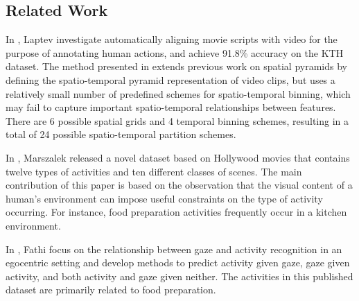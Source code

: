 \documentclass[10pt,twocolumn,letterpaper]{article}
\begin{document}
\subsection{Related Work}


	In \cite{Laptev08}, Laptev \etal investigate automatically aligning movie scripts with
	video for the purpose of annotating human actions, and achieve 91.8\%
  accuracy on the KTH dataset. The method presented in \cite{Laptev08} 
  extends previous work on spatial pyramids \cite{Bosch07, Lazebnik06}
  by defining the spatio-temporal pyramid representation of video clips, but uses a
  relatively small number of predefined schemes for spatio-temporal binning,
  which may fail to capture important spatio-temporal relationships between
  features. There are 6 possible spatial grids and 4 temporal binning
  schemes, resulting in a total of 24 possible spatio-temporal partition
  schemes. 
	
	In \cite{Marszalek09}, Marszalek \etal released a novel dataset based on
	Hollywood movies that contains twelve types of activities and ten
	different classes of scenes. The main contribution of this paper is based
	on the observation that the visual content of a human's environment can
	impose useful constraints on the type of activity occurring. For instance,
	food preparation activities frequently occur in a kitchen environment. 
	
	In \cite{Fathi12}, Fathi \etal focus on the relationship between gaze and
	activity recognition in an egocentric setting and develop methods to
	predict activity given gaze, gaze given activity, and both
	activity and gaze given neither. The activities in this
	published dataset are primarily related to food preparation. 
	
\end{document}

